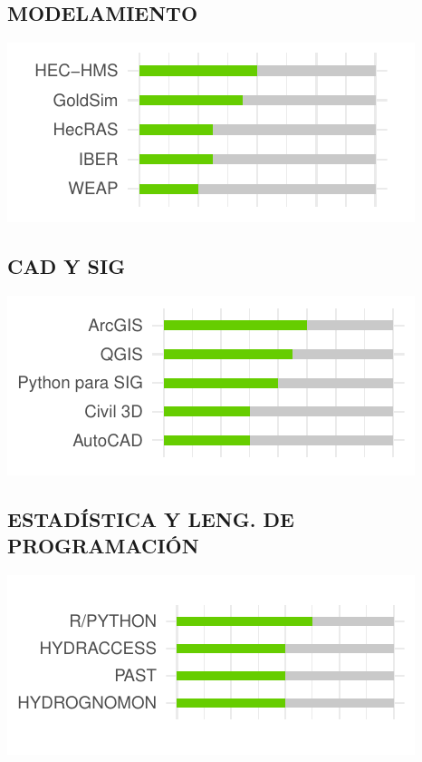 \documentclass[
  10,
]{article}
\begin{document}
\hypertarget{modelamiento}{%
\subsection{MODELAMIENTO}\label{modelamiento}}

\includegraphics{resume_v01a_files/figure-latex/unnamed-chunk-1-1.pdf}

\hypertarget{cad-y-sig}{%
\subsection{CAD Y SIG}\label{cad-y-sig}}

\includegraphics{resume_v01a_files/figure-latex/unnamed-chunk-2-1.pdf}

\hypertarget{estaduxedstica-y-leng.-de-programaciuxf3n}{%
\subsection{ESTADÍSTICA Y LENG. DE
PROGRAMACIÓN}\label{estaduxedstica-y-leng.-de-programaciuxf3n}}

\includegraphics{resume_v01a_files/figure-latex/unnamed-chunk-3-1.pdf}
\end{document}
